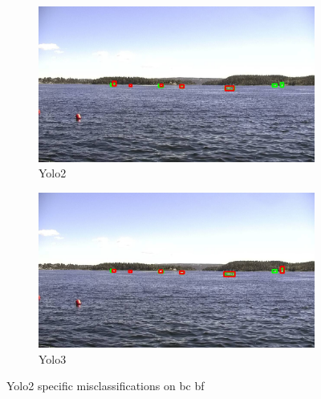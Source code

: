 \begin{figure}[h!]
\begin{subfigure}{.5\textwidth}
  \centering
  \includegraphics[width=0.9\linewidth]{results/case_buildings/yolo23/3better/yolo2/selected_06_25_frame0057.jpg}
  \caption{Yolo2}
\end{subfigure}%
\begin{subfigure}{.5\textwidth}
  \centering
  \includegraphics[width=.9\linewidth]{results/case_buildings/yolo23/3better/yolo3/selected_06_25_frame0057.jpg}
  \caption{Yolo3}
\end{subfigure}
\caption{Yolo2 specific misclassifications on bc bf}
\label{img:yolo2_misclas}


\end{figure}
